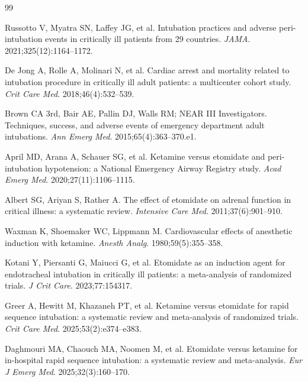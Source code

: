 \documentclass[11pt]{article}
\begin{document}
\begingroup
\renewcommand{\section}[2]{}
\begin{thebibliography}{99}


Russotto V, Myatra SN, Laffey JG, et al.
Intubation practices and adverse peri-intubation events in critically ill patients from 29 countries.
\textit{JAMA}. 2021;325(12):1164--1172.

De Jong A, Rolle A, Molinari N, et al.
Cardiac arrest and mortality related to intubation procedure in critically ill adult patients: a multicenter cohort study.
\textit{Crit Care Med}. 2018;46(4):532--539.

Brown CA 3rd, Bair AE, Pallin DJ, Walls RM; NEAR III Investigators.
Techniques, success, and adverse events of emergency department adult intubations.
\textit{Ann Emerg Med}. 2015;65(4):363--370.e1.

April MD, Arana A, Schauer SG, et al.
Ketamine versus etomidate and peri-intubation hypotension: a National Emergency Airway Registry study.
\textit{Acad Emerg Med}. 2020;27(11):1106--1115.

Albert SG, Ariyan S, Rather A.
The effect of etomidate on adrenal function in critical illness: a systematic review.
\textit{Intensive Care Med}. 2011;37(6):901--910.

Waxman K, Shoemaker WC, Lippmann M.
Cardiovascular effects of anesthetic induction with ketamine.
\textit{Anesth Analg}. 1980;59(5):355--358.

Kotani Y, Piersanti G, Maiucci G, et al.
Etomidate as an induction agent for endotracheal intubation in critically ill patients: a meta-analysis of randomized trials.
\textit{J Crit Care}. 2023;77:154317.

Greer A, Hewitt M, Khazaneh PT, et al.
Ketamine versus etomidate for rapid sequence intubation: a systematic review and meta-analysis of randomized trials.
\textit{Crit Care Med}. 2025;53(2):e374--e383.

Daghmouri MA, Chaouch MA, Noomen M, et al.
Etomidate versus ketamine for in-hospital rapid sequence intubation: a systematic review and meta-analysis.
\textit{Eur J Emerg Med}. 2025;32(3):160--170.


\end{thebibliography}
\end{document}
